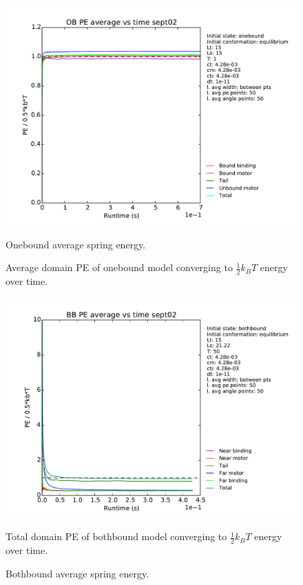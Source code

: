 \documentclass[10pt]{article} %
\begin{document}
\begin{figure}[h!]
  \centering
  \begin{minipage}[b]{0.45\textwidth}
    \includegraphics[width=\textwidth]{../../figures/OB_Average_PE.pdf}
    \caption{Onebound average spring energy.}{Average domain PE of onebound model converging to $\frac12 k_BT$ energy over time.}
  \end{minipage}
  \hspace{.2cm}
  \begin{minipage}[b]{0.45\textwidth}
    \includegraphics[width=\textwidth]{../../figures/BB_Average_PE.pdf}
    \caption{Bothbound average spring energy.}{Total domain PE of bothbound model converging to $\frac12 k_BT$ energy over time.}
  \end{minipage}
  \label{fig:equipartition_agreement}
\end{figure}
\end{document}
